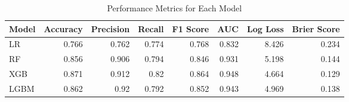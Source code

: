 \begin{table}[H]\centering
\caption{Performance Metrics for Each Model}
\label{Table 3 :performance_metrics}
\begin{tabular}{lrrrrrrr}
\toprule
Model & Accuracy & Precision & Recall & F1 Score & AUC & Log Loss & Brier Score \\
\midrule
LR & 0.766 & 0.762 & 0.774 & 0.768 & 0.832 & 8.426 & 0.234 \\
RF & 0.856 & 0.906 & 0.794 & 0.846 & 0.931 & 5.198 & 0.144 \\
XGB & 0.871 & 0.912 & 0.82 & 0.864 & 0.948 & 4.664 & 0.129 \\
LGBM & 0.862 & 0.92 & 0.792 & 0.852 & 0.943 & 4.969 & 0.138 \\
\bottomrule
\end{tabular}
\end{table}
